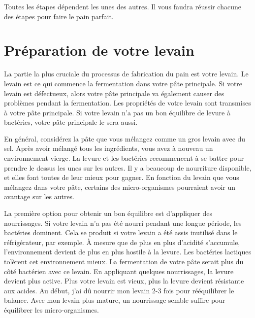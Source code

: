 Toutes les étapes dépendent les unes des autres. Il vous faudra réussir chacune
des étapes pour faire le pain parfait.

\section{Préparation de votre levain}%
\label{section:préparation-levain}

La partie la plus cruciale du processus de fabrication du pain est votre levain.
Le levain est ce qui commence la fermentation dans votre pâte principale.
Si votre levain est défectueux, alors votre pâte principale va également 
causer des problèmes pendant la fermentation. Les propriétés de votre levain
sont transmises à votre pâte principale. Si votre levain
n'a pas un bon équilibre de levure à bactéries, votre
pâte principale le sera aussi.

En général, considérez la pâte que vous mélangez comme un gros levain avec du sel.
Après avoir mélangé tous les ingrédients, vous avez à nouveau un environnement vierge.
La levure et les bactéries recommencent à se battre pour prendre le dessus les unes sur les autres.
Il y a beaucoup de nourriture disponible, et elles font toutes de leur mieux pour gagner.
En fonction du levain que vous mélangez dans votre pâte, certains des micro-organismes
pourraient avoir un avantage sur les autres.

La première option pour obtenir un bon équilibre est d'appliquer des nourrissages.
Si votre levain n'a pas été nourri pendant une longue période, les
bactéries dominent. Cela se produit si votre levain a été
assis inutilisé dans le réfrigérateur, par exemple. À mesure que de plus en plus
d'acidité s'accumule, l'environnement devient de plus en plus hostile
à la levure. Les bactéries lactiques tolèrent cet environnement
mieux. La fermentation de votre pâte serait plus du côté
bactérien avec ce levain. En appliquant quelques
nourrissages, la levure devient plus active. Plus votre
levain est vieux, plus la levure devient résistante aux acides. Au début,
j'ai dû nourrir mon levain 2-3 fois pour rééquilibrer le balance. Avec mon
levain plus mature, un nourrissage semble suffire pour équilibrer
les micro-organismes.

